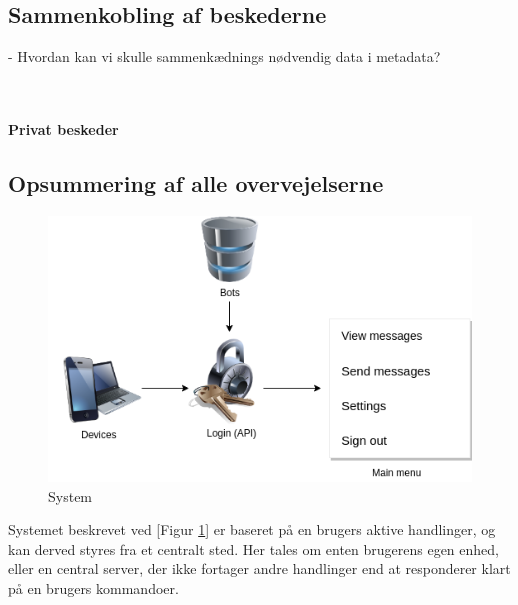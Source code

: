 

\subsection{Sammenkobling af beskederne}

- Hvordan kan vi skulle sammenkædnings nødvendig data i metadata?

\\\\
\textbf{Privat beskeder}\\





\subsection{Opsummering af alle overvejelserne}
\begin{figure}[H]
    \centering
    \includegraphics[width=0.70\linewidth]{Projectdoc/Assets/Illustrationer/simple-system.png}
    \caption{System}
    \label{fig:sysdiagram}
\end{figure}

Systemet beskrevet ved [Figur \ref{fig:sysdiagram}] er baseret på en brugers aktive handlinger, og kan derved styres fra et centralt sted. Her tales om enten brugerens egen enhed, eller en central server, der ikke fortager andre handlinger end at responderer klart på en brugers kommandoer.

